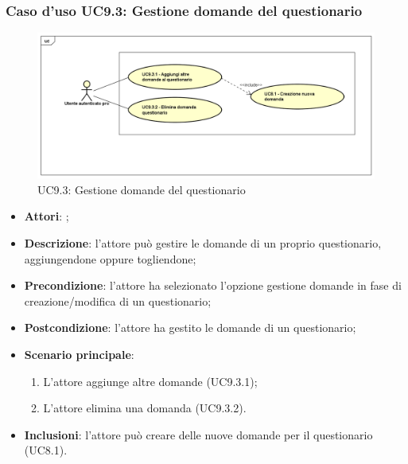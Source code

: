 	 \subsubsection{Caso d'uso UC9.3: Gestione domande del questionario}
	 \label{UC9.3}
	 \begin{figure}[h]
	 	\centering
	 	\includegraphics[scale=0.45,keepaspectratio]{UML/UC9_3.png}
	 	\caption{UC9.3: Gestione domande del questionario}
	 \end{figure}
	 \FloatBarrier
	 \begin{itemize}
	 	\item \textbf{Attori}: \uaupro{};
	 	\item \textbf{Descrizione}: l'attore può gestire le domande di un proprio questionario, aggiungendone oppure togliendone;
	 	\item \textbf{Precondizione}: l'attore ha selezionato l'opzione gestione domande in fase di \\creazione/modifica di un questionario;
	 	\item \textbf{Postcondizione}: l'attore ha gestito le domande di un questionario;
	 	\item \textbf{Scenario principale}: 
	 	\begin{enumerate}
	 		\item L'attore aggiunge altre domande (UC9.3.1);
	 		\item L'attore elimina una domanda (UC9.3.2).
	 	\end{enumerate}
	 	\item \textbf{Inclusioni}: l'attore può creare delle nuove domande per il questionario (UC8.1).		
	 \end{itemize}
	 
